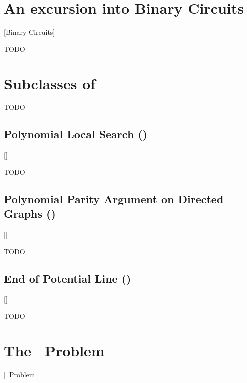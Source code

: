 \section{An excursion into Binary Circuits}[Binary Circuits]

TODO

\section{Subclasses of \TFNP}

TODO

\subsection{Polynomial Local Search (\PLS)}[\PLS]

TODO

\subsection{Polynomial Parity Argument on Directed Graphs (\PPAD)}[\PPAD]

TODO

\subsection{End of Potential Line (\EOPL)}[\EOPL]

TODO

\section{The \Tarski\ Problem}[\Tarski\ Problem]